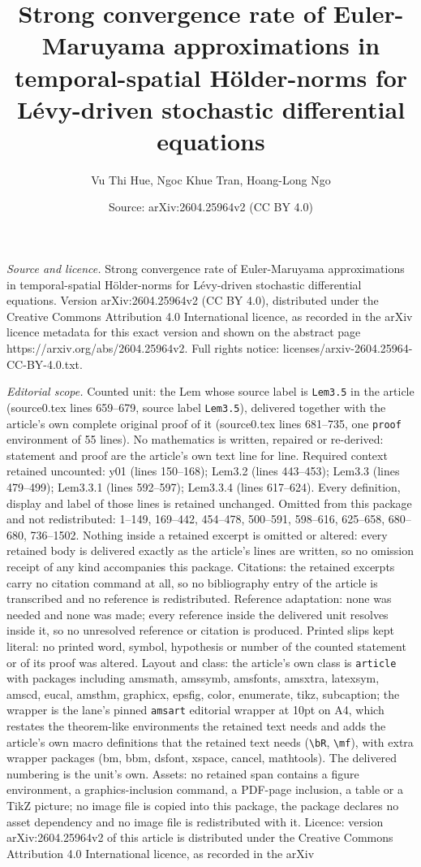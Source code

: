 \documentclass[10pt,a4paper]{amsart}
\title[Strong convergence rate of Euler-Maruyama approximations in ]{Strong convergence rate of Euler-Maruyama approximations in temporal-spatial H\"older-norms for L\'evy-driven stochastic differential equations}
\author{Vu Thi Hue, Ngoc Khue Tran, Hoang-Long Ngo}
\date{Source: arXiv:2604.25964v2 (CC BY 4.0)}
\begin{document}
\maketitle

\noindent\emph{Source and licence.} Strong convergence rate of Euler-Maruyama approximations in temporal-spatial H\"older-norms for L\'evy-driven stochastic differential equations. Version arXiv:2604.25964v2 (CC BY 4.0), distributed under the Creative Commons Attribution 4.0 International licence, as recorded in the arXiv licence metadata for this exact version and shown on the abstract page https://arxiv.org/abs/2604.25964v2. Full rights notice: licenses/arxiv-2604.25964-CC-BY-4.0.txt.\par\smallskip

\noindent\textit{Editorial scope.} Counted unit: the Lem whose source label is \texttt{Lem3.5} in the article (source0.tex lines 659--679, source label \texttt{Lem3.5}), delivered together with the article's own complete original proof of it (source0.tex lines 681--735, one \texttt{proof} environment of 55 lines). No mathematics is written, repaired or re-derived: statement and proof are the article's own text line for line. Required context retained uncounted: y01 (lines 150--168); Lem3.2 (lines 443--453); Lem3.3 (lines 479--499); Lem3.3.1 (lines 592--597); Lem3.3.4 (lines 617--624). Every definition, display and label of those lines is retained unchanged. Omitted from this package and not redistributed: 1--149, 169--442, 454--478, 500--591, 598--616, 625--658, 680--680, 736--1502. Nothing inside a retained excerpt is omitted or altered: every retained body is delivered exactly as the article's lines are written, so no omission receipt of any kind accompanies this package. Citations: the retained excerpts carry no citation command at all, so no bibliography entry of the article is transcribed and no reference is redistributed. Reference adaptation: none was needed and none was made; every reference inside the delivered unit resolves inside it, so no unresolved reference or citation is produced. Printed slips kept literal: no printed word, symbol, hypothesis or number of the counted statement or of its proof was altered. Layout and class: the article's own class is \texttt{article} with packages including amsmath, amssymb, amsfonts, amsxtra, latexsym, amscd, eucal, amsthm, graphicx, epsfig, color, enumerate, tikz, subcaption; the wrapper is the lane's pinned \texttt{amsart} editorial wrapper at 10pt on A4, which restates the theorem-like environments the retained text needs and adds the article's own macro definitions that the retained text needs (\texttt{\textbackslash bR}, \texttt{\textbackslash mf}), with extra wrapper packages (bm, bbm, dsfont, xspace, cancel, mathtools). The delivered numbering is the unit's own. Assets: no retained span contains a figure environment, a graphics-inclusion command, a PDF-page inclusion, a table or a TikZ picture; no image file is copied into this package, the package declares no asset dependency and no image file is redistributed with it. Licence: version arXiv:2604.25964v2 of this article is distributed under the Creative Commons Attribution 4.0 International licence, as recorded in the arXiv 
\end{document}
